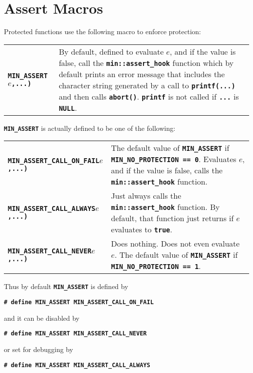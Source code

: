 \documentclass[12pt]{article}
\makeatletter
\newcommand{\TT}[1]{{\tt \bfseries #1}}
\newcommand{\ttkey}[1]{\TT{#1}\index{#1@{\tt #1}}}
\newcommand{\EOL}{\penalty \exhyphenpenalty}
\newenvironment{indpar}[1][0.3in]%
	{\begin{list}{}%
		     {\setlength{\itemsep}{0in}%
		      \setlength{\topsep}{0in}%
		      \setlength{\parsep}{1ex}%
		      \setlength{\labelwidth}{#1}%
		      \setlength{\leftmargin}{#1}%
		      \addtolength{\leftmargin}{\labelsep}}%
	 \item}%
	{\end{list}}
\newcommand{\LABEL}[1]{\label{#1}}
\newcommand{\TTKEY}[1]{\ttkey{#1}}
\makeatother
\begin{document}
\section{Assert Macros}
\label{ASSERT_MACROS}

Protected functions use the following macro to enforce protection:

\begin{indpar}\begin{tabular}{lp{4.0in}}
\TTKEY{MIN\_ASSERT}\TT{(}$e$\TT{,...)}
	& By default, defined to evaluate $e$, and if the value is
	  false, call the \TT{min::\EOL assert\_\EOL hook} function which
	  by default prints an error message that includes the
	  character string generated by a call to
	  \TT{printf(...)} and then calls \TT{abort()}.
	  \TT{printf} is not called if \TT{...} is \TT{NULL}.
\LABEL{MIN_ASSERT} \\
\end{tabular}\end{indpar}

\TT{MIN\_ASSERT} is actually defined to be one of the following:
\begin{indpar}\begin{tabular}{lp{3.0in}}
\TTKEY{MIN\_ASSERT\_CALL\_ON\_FAIL}\TT{(}$e$\TT{,...)}
	& The default value of \TT{MIN\_ASSERT}
	  if \TT{MIN\_\EOL NO\_\EOL PROTECTION == 0}.
	  Evaluates $e$, and if the value is
	  false, calls the \TT{min::\EOL assert\_\EOL hook} function.
\LABEL{MIN_ASSERT_CALL_ON_FAIL} \\
\TTKEY{MIN\_ASSERT\_CALL\_ALWAYS}\TT{(}$e$\TT{,...)}
	& Just always calls the \TT{min::\EOL assert\_\EOL hook} function.
	  By default,
	  that function just returns if $e$ evaluates to \TT{true}.
\LABEL{MIN_ASSERT_CALL_ALWAYS} \\
\TTKEY{MIN\_ASSERT\_CALL\_NEVER}\TT{(}$e$\TT{,...)}
	& Does nothing.  Does not even evaluate $e$.
	  The default value of \TT{MIN\_ASSERT}
	  if \TT{MIN\_\EOL NO\_\EOL PROTECTION == 1}.
\LABEL{MIN_ASSERT_CALL_NEVER} \\
\end{tabular}\end{indpar}

Thus by default \TT{MIN\_ASSERT} is defined by
\begin{center}
\TT{\# define MIN\_ASSERT MIN\_ASSERT\_CALL\_ON\_FAIL}
\end{center}
and it can be disabled by
\begin{center}
\TT{\# define MIN\_ASSERT MIN\_ASSERT\_CALL\_NEVER}
\end{center}
or set for debugging by
\begin{center}
\TT{\# define MIN\_ASSERT MIN\_ASSERT\_CALL\_ALWAYS}
\end{center}
\end{document}
